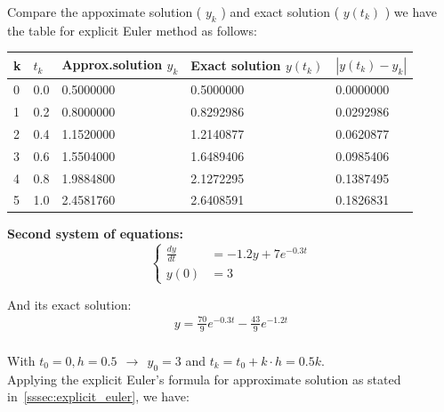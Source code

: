 \documentclass[a4paper]{article}
\numberwithin{equation}{section}
\begin{document}
 Compare the appoximate solution ( \(y_k\) ) and exact solution  ( \(y(t_k)\) ) we have the  table for explicit Euler method as follows:
 
 \begin{table}[H]
 \centering
\begin{tabular}{|l|l|l|l|l|}
\hline
k & \(t_k\)  &  Approx.solution \(y_k\)       &  Exact solution \(y(t_k)\)     & \(|y(t_k)-y_k|\) \\ \hline
0 & 0.0 & 0.5000000 & 0.5000000 & 0.0000000   \\ \hline
1 & 0.2 & 0.8000000 & 0.8292986 & 0.0292986   \\ \hline
2 & 0.4 & 1.1520000 & 1.2140877 & 0.0620877   \\ \hline
3 & 0.6 & 1.5504000 & 1.6489406 & 0.0985406   \\ \hline
4 & 0.8 & 1.9884800 & 2.1272295 & 0.1387495   \\ \hline
5 & 1.0 & 2.4581760 & 2.6408591 & 0.1826831   \\ \hline
\end{tabular}
\end{table}
 
\textbf{Second system of equations:}
\begin{equation*}
  \begin{cases}
    \frac{dy}{dt} & = -1.2y + 7e^{-0.3t}  \\
    y(0)          & = 3
  \end{cases}
\end{equation*}

And its exact solution:
\begin{align*}
   y = \frac{70}{9}e^{-0.3t}-\frac{43}{9}e^{-1.2t}\\
\end{align*}

With \(t_0 = 0, h=0.5 ~~\rightarrow ~~ y_0 = 3\) and \(t_k = t_0 + k \cdot h = 0.5k\).\\

Applying the explicit Euler's formula for approximate solution as stated in~\ref{sssec:explicit_euler}, we have: 
\end{document}
